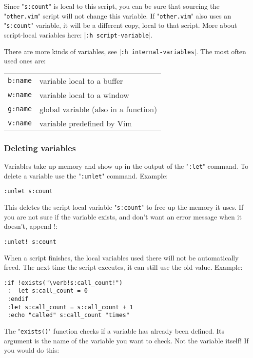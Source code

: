 Since "\verb!s:count!" is local to this script, you can be sure that sourcing the "\verb!other.vim!" script will not change this variable.
If "\verb!other.vim!" also uses an "\verb!s:count!" variable, it will be a different copy, local to that script.
More about script-local variables here: |\verb!:h script-variable!|.

There are more kinds of variables, see |\verb!:h internal-variables!|.
The most often used ones are:

\begin{center} \begin{tabular}{c l}
				\verb!b:name! & variable local to a buffer \\
				\verb!w:name! & variable local to a window \\
				\verb!g:name! & global variable (also in a function) \\
				\verb!v:name! & variable predefined by Vim \\
\end{tabular} \end{center}
\subsubsection{Deleting variables}
Variables take up memory and show up in the output of the "\verb!:let!" command.
To delete a variable use the "\verb!:unlet!" command.
Example:

\begin{Verbatim}[samepage=true]
 :unlet s:count
\end{Verbatim}

This deletes the script-local variable "\verb!s:count!" to free up the memory it uses.
If you are not sure if the variable exists, and don't want an error message when it doesn't, append !:

\begin{Verbatim}[samepage=true]
 :unlet! s:count
\end{Verbatim}

When a script finishes, the local variables used there will not be automatically freed.
The next time the script executes, it can still use the old value.
Example:

\begin{Verbatim}[samepage=true]
 :if !exists("\verb!s:call_count!")
 :  let s:call_count = 0
 :endif
 :let s:call_count = s:call_count + 1
 :echo "called" s:call_count "times"
\end{Verbatim}

The "\verb!exists()!" function checks if a variable has already been defined.
Its argument is the name of the variable you want to check.
Not the variable itself!  If you would do this:

